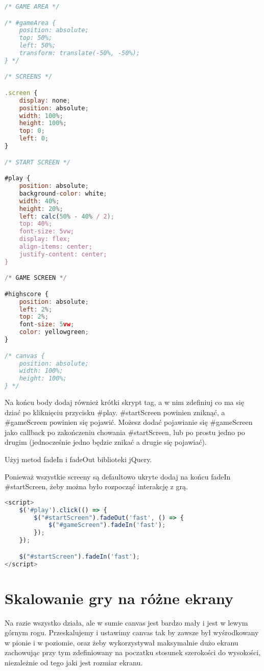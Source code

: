 \documentclass[12pt]{article}
\begin{document}
\begin{lstlisting}[language=JavaScript]
/* GAME AREA */

/* #gameArea {
    position: absolute;
    top: 50%;
    left: 50%;
    transform: translate(-50%, -50%);
} */

/* SCREENS */

.screen {
    display: none;
    position: absolute;
    width: 100%;
    height: 100%;
    top: 0;
    left: 0;
}

/* START SCREEN */

#play {
    position: absolute;
    background-color: white;
    width: 40%;
    height: 20%;
    left: calc(50% - 40% / 2);
    top: 40%;
    font-size: 5vw;
    display: flex;
    align-items: center;
    justify-content: center;
}

/* GAME SCREEN */

#highscore {
    position: absolute;
    left: 2%;
    top: 2%;
    font-size: 5vw;
    color: yellowgreen;
}

/* canvas {
    position: absolute;
    width: 100%;
    height: 100%;
} */
\end{lstlisting}

Na końcu body dodaj również krótki skrypt tag, a w nim zdefiniuj co ma się dziać po kliknięciu przycisku #play. #startScreen powinien zniknąć, a #gameScreen powinien się pojawić. Możesz dodać pojawianie się #gameScreen jako callback po zakończeniu chowania #startScreen, lub po prostu jedno po drugim (jednocześnie jedno będzie znikać a drugie się pojawiać).

Użyj metod fadeIn i fadeOut biblioteki jQuery.

Ponieważ wszystkie screeny są defaultowo ukryte dodaj na końcu fadeIn #startScreen, żeby można było rozpocząć interakcję z grą.

\begin{lstlisting}[language=JavaScript]
<script>
	$('#play').click(() => {
		$("#startScreen").fadeOut('fast', () => {
            $("#gameScreen").fadeIn('fast');
        });
	});

    $("#startScreen").fadeIn('fast');
</script>
\end{lstlisting}

\section{Skalowanie gry na różne ekrany}
Na razie wszystko działa, ale w sumie canvas jest bardzo mały i jest w lewym górnym rogu. Przeskalujemy i ustawimy canvas tak by zawsze był wyśrodkowany w pionie i w poziomie, oraz żeby wykorzystywał maksymalnie dużo ekranu zachowując przy tym zdefiniowany na poczatku stosunek szerokości do wysokości, niezależnie od tego jaki jest rozmiar ekranu.
\end{document}

